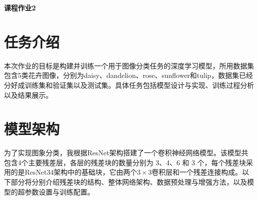 \documentclass[11pt]{article}
\begin{document}
	\pagestyle{fancy}
	\chead{}
	
	\begin{center}
		{\LARGE \bf 课程作业2} 
	\end{center}
	\begin{center}
		\large{}
	\end{center}

	\section{任务介绍}

	本次作业的目标是构建并训练一个用于图像分类任务的深度学习模型，所用数据集包含5类花卉图像，分别为daisy、dandelion、rose、sunflower和tulip，数据集已经分好成训练集和验证集以及测试集。具体任务包括模型设计与实现、训练过程分析以及结果展示。
	\section{模型架构}
	为了实现图象分类，我根据ResNet架构搭建了一个卷积神经网络模型。该模型共包含4个主要残差层，各层的残差块的数量分别为 3、4、6 和 3 个，每个残差块采用的是ResNet34架构中的基础块，它由两个$3\times3$卷积层和一个残差连接构成。以下部分将分别介绍残差块的结构、整体网络架构、数据预处理与增强方法，以及模型的超参数设置与训练配置。
\end{document}
